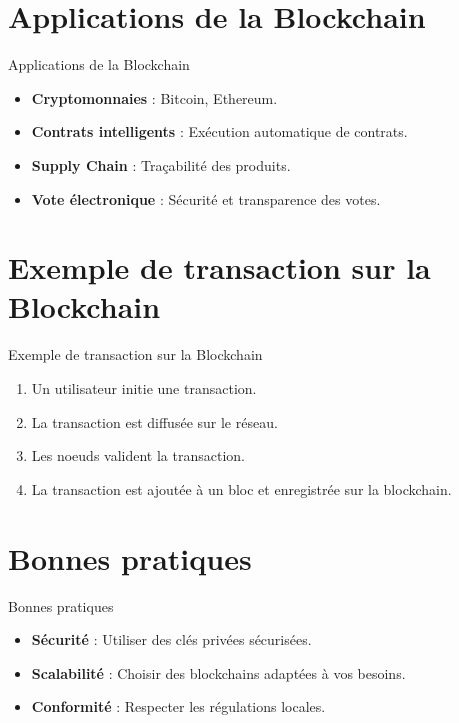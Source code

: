 \documentclass{clbeamer2024}
\begin{document}
\section{Applications de la Blockchain}
\begin{frame}{Applications de la Blockchain}
	\begin{itemize}
		\item \textbf{Cryptomonnaies} : Bitcoin, Ethereum.
		\item \textbf{Contrats intelligents} : Exécution automatique de contrats.
		\item \textbf{Supply Chain} : Traçabilité des produits.
		\item \textbf{Vote électronique} : Sécurité et transparence des votes.
	\end{itemize}
\end{frame}


\section{Exemple de transaction sur la Blockchain}
\begin{frame}{Exemple de transaction sur la Blockchain}
	\begin{enumerate}
		\item Un utilisateur initie une transaction.
		\item La transaction est diffusée sur le réseau.
		\item Les noeuds valident la transaction.
		\item La transaction est ajoutée à un bloc et enregistrée sur la blockchain.
	\end{enumerate}
\end{frame}


\section{Bonnes pratiques}
\begin{frame}{Bonnes pratiques}
	\begin{itemize}
		\item \textbf{Sécurité} : Utiliser des clés privées sécurisées.
		\item \textbf{Scalabilité} : Choisir des blockchains adaptées à vos besoins.
		\item \textbf{Conformité} : Respecter les régulations locales.
	\end{itemize}
\end{frame}
\end{document}
